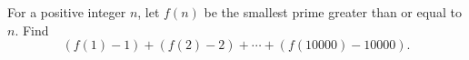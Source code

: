 For a positive integer $n$, let $f(n)$ be the smallest prime greater than or equal to $n$. Find
\[(f(1)-1)+(f(2)-2)+\cdots+(f(10000)-10000).\]
